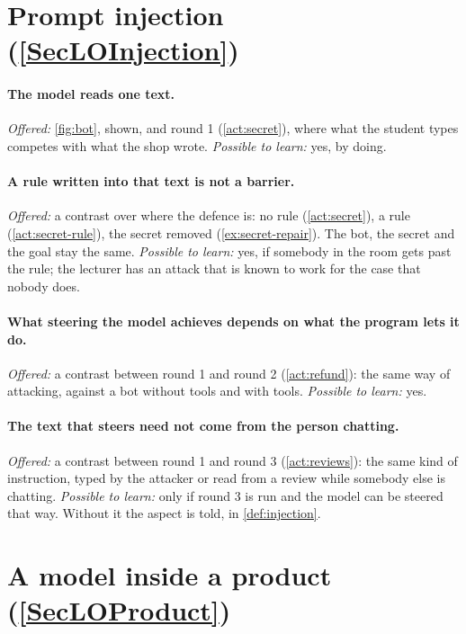 \section{Prompt injection (\cref{SecLOInjection})}
\label{sec:design-injection}

\SecLOInjection*

\paragraph{The model reads one text.}
\emph{Offered:} \cref{fig:bot}, shown, and round 1
(\cref{act:secret}), where what the student types competes with
what the shop wrote.
\emph{Possible to learn:} yes, by doing.
\paragraph{A rule written into that text is not a barrier.}
\emph{Offered:} a contrast over where the defence is: no rule
(\cref{act:secret}), a rule (\cref{act:secret-rule}), the secret
removed (\cref{ex:secret-repair}).
The bot, the secret and the goal stay the same.
\emph{Possible to learn:} yes, if somebody in the room gets past
the rule; the lecturer has an attack that is known to work for the
case that nobody does.
\paragraph{What steering the model achieves depends on what the program
  lets it do.}
\emph{Offered:} a contrast between round 1 and round 2
(\cref{act:refund}): the same way of attacking, against a bot
without tools and with tools.
\emph{Possible to learn:} yes.
\paragraph{The text that steers need not come from the person chatting.}
\emph{Offered:} a contrast between round 1 and round 3
(\cref{act:reviews}): the same kind of instruction, typed by the
attacker or read from a review while somebody else is chatting.
\emph{Possible to learn:} only if round 3 is run and the model can
be steered that way.
Without it the aspect is told, in \cref{def:injection}.


\section{A model inside a product (\cref{SecLOProduct})}
\label{sec:design-product}


